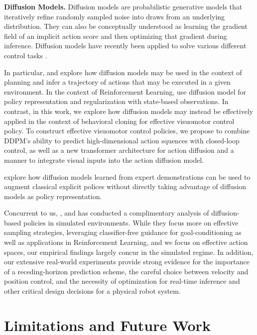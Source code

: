\documentclass[Afour,sageh,times]{sagej}
\begin{document}
\textbf{Diffusion Models.}
Diffusion models are probabilistic generative models that iteratively refine randomly sampled noise into draws from an underlying distribution. They can also be conceptually understood as learning the gradient field of an implicit action score and then optimizing that gradient during inference.
Diffusion models \citep{sohldickstein2015nonequilibrium, ho2020denoising} have recently been applied to solve various different control tasks \citep{janner2022diffuser, urain2022se, ajay2022conditional}.

In particular, \citet{janner2022diffuser} and \citet{huang2023diffusion} explore how diffusion models may be  used in the context of planning and infer a trajectory of actions that may be executed in a given environment.
In the context of Reinforcement Learning, \citet{wang2022diffusion} use diffusion model for policy representation and regularization with state-based observations.
In contrast, in this work, we explore how diffusion models may instead be effectively applied in the context of behavioral cloning for effective visuomotor control policy.
To construct effective visuomotor control policies, we propose to combine DDPM's ability to predict high-dimensional action squences with closed-loop control, as well as a new transformer architecture for action diffusion and a manner to integrate visual inputs into the action diffusion model.

\citet{wang2023diffusion} explore how diffusion models learned from expert demonstrations can be used to augment classical explicit polices without directly taking advantage of diffusion models as policy representation.

Concurrent to us, \citet{pearce2023imitating}, \citet{reuss2023goal} and \citet{hansen2023idql} has conducted a complimentary analysis of diffusion-based policies in simulated environments. While they focus more on effective sampling strategies, leveraging classifier-free guidance for goal-conditioning as well as applications in Reinforcement Learning, and we focus on effective action spaces, our empirical findings largely concur in the simulated regime.  In addition, our extensive real-world experiments provide strong evidence for the importance of a receding-horizon prediction scheme, the careful choice between velocity and position control, and the necessity of optimization for real-time inference and other critical design decisions for a physical robot system.

\section{Limitations and Future Work}
\end{document}
